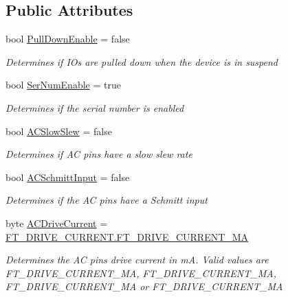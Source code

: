 \subsection*{Public Attributes}
\begin{DoxyCompactItemize}
\item 
bool \mbox{\hyperlink{class_f_t_d2_x_x___n_e_t_1_1_f_t_d_i_1_1_f_t232_h___e_e_p_r_o_m___s_t_r_u_c_t_u_r_e_a588ca8a33717a3eb81dd67673bfbecc8}{Pull\+Down\+Enable}} = false
\begin{DoxyCompactList}\small\item\em Determines if I\+Os are pulled down when the device is in suspend \end{DoxyCompactList}\item 
bool \mbox{\hyperlink{class_f_t_d2_x_x___n_e_t_1_1_f_t_d_i_1_1_f_t232_h___e_e_p_r_o_m___s_t_r_u_c_t_u_r_e_a2652a27a352b7b839893523728b43307}{Ser\+Num\+Enable}} = true
\begin{DoxyCompactList}\small\item\em Determines if the serial number is enabled \end{DoxyCompactList}\item 
bool \mbox{\hyperlink{class_f_t_d2_x_x___n_e_t_1_1_f_t_d_i_1_1_f_t232_h___e_e_p_r_o_m___s_t_r_u_c_t_u_r_e_a4fab9603cfea923de6955a39e234b27c}{A\+C\+Slow\+Slew}} = false
\begin{DoxyCompactList}\small\item\em Determines if AC pins have a slow slew rate \end{DoxyCompactList}\item 
bool \mbox{\hyperlink{class_f_t_d2_x_x___n_e_t_1_1_f_t_d_i_1_1_f_t232_h___e_e_p_r_o_m___s_t_r_u_c_t_u_r_e_aa93441d370de2d414d8f372100e12715}{A\+C\+Schmitt\+Input}} = false
\begin{DoxyCompactList}\small\item\em Determines if the AC pins have a Schmitt input \end{DoxyCompactList}\item 
byte \mbox{\hyperlink{class_f_t_d2_x_x___n_e_t_1_1_f_t_d_i_1_1_f_t232_h___e_e_p_r_o_m___s_t_r_u_c_t_u_r_e_ad598a38530c322e1c64312048e68c70a}{A\+C\+Drive\+Current}} = \mbox{\hyperlink{class_f_t_d2_x_x___n_e_t_1_1_f_t_d_i_1_1_f_t___d_r_i_v_e___c_u_r_r_e_n_t_af6b404bcc6f2eb88bbc95b183d5729ea}{F\+T\+\_\+\+D\+R\+I\+V\+E\+\_\+\+C\+U\+R\+R\+E\+N\+T.\+F\+T\+\_\+\+D\+R\+I\+V\+E\+\_\+\+C\+U\+R\+R\+E\+N\+T\+\_\+MA}}
\begin{DoxyCompactList}\small\item\em Determines the AC pins drive current in mA. Valid values are F\+T\+\_\+\+D\+R\+I\+V\+E\+\_\+\+C\+U\+R\+R\+E\+N\+T\+\_\+MA, F\+T\+\_\+\+D\+R\+I\+V\+E\+\_\+\+C\+U\+R\+R\+E\+N\+T\+\_\+MA, F\+T\+\_\+\+D\+R\+I\+V\+E\+\_\+\+C\+U\+R\+R\+E\+N\+T\+\_\+MA or F\+T\+\_\+\+D\+R\+I\+V\+E\+\_\+\+C\+U\+R\+R\+E\+N\+T\+\_\+MA \end{DoxyCompactList}\item 

\end{DoxyCompactItemize}
